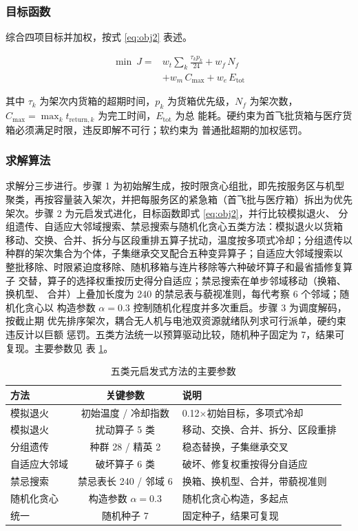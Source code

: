 \subsubsection{目标函数}

综合四项目标并加权，按式 \eqref{eq:obj2} 表述。

\begin{equation}
\begin{aligned}
\min\ J ={} & w_t \sum_k \frac{\tau_k p_k}{24} + w_f\, N_f \\
& + w_m\, C_{\max} + w_e\, E_{\mathrm{tot}}
\end{aligned}
\label{eq:obj2}
\end{equation}

其中 $\tau_k$ 为架次内货箱的超期时间，$p_k$ 为货箱优先级，$N_f$ 为架次数，
$C_{\max}=\max_k t_{\mathrm{return},k}$ 为完工时间，$E_{\mathrm{tot}}$ 为总
能耗。硬约束为首飞批货箱与医疗货箱必须满足时限，违反即解不可行；软约束为
普通批超期的加权惩罚。

\subsubsection{求解算法}

求解分三步进行。步骤 1 为初始解生成，按时限贪心组批，即先按服务区与机型
聚类，再按容量装入架次，并把每服务区的紧急箱（首飞批与医疗箱）拆出为优先
架次。步骤 2 为元启发式进化，目标函数即式 \eqref{eq:obj2}，并行比较模拟退火、
分组遗传、自适应大邻域搜索、禁忌搜索与随机化贪心五类方法：模拟退火以货箱
移动、交换、合并、拆分与区段重排五算子扰动，温度按多项式冷却；分组遗传以
种群的架次集合为个体，子集继承交叉配合五种变异算子；自适应大邻域搜索以
整批移除、时限紧迫度移除、随机移箱与连片移除等六种破坏算子和最省插修复算子
交替，算子的选择权重按历史得分自适应；禁忌搜索在单步邻域移动（换箱、换机型、
合并）上叠加长度为 240 的禁忌表与藐视准则，每代考察 6 个邻域；随机化贪心以
构造参数 $\alpha=0.3$ 控制随机化程度并多次重启。步骤 3 为调度解码，按截止期
优先排序架次，耦合无人机与电池双资源就绪队列求可行派单，硬约束违反计以巨额
惩罚。五类方法统一以预算驱动比较，随机种子固定为 7，结果可复现。主要参数见
表 \ref{tab:gaparams}。

\begin{table}[htbp]
\centering
\caption{五类元启发式方法的主要参数}
\label{tab:gaparams}
\begin{tabular}{lcl}
\toprule
方法 & 关键参数 & 说明 \\
\midrule
模拟退火 & 初始温度 / 冷却指数 & 0.12$\times$初始目标，多项式冷却 \\
模拟退火 & 扰动算子 5 类 & 移动、交换、合并、拆分、区段重排 \\
分组遗传 & 种群 28 / 精英 2 & 稳态替换，子集继承交叉 \\
自适应大邻域 & 破坏算子 6 类 & 破坏、修复权重按得分自适应 \\
禁忌搜索 & 禁忌表长 240 / 邻域 6 & 换箱、换机型、合并，带藐视准则 \\
随机化贪心 & 构造参数 $\alpha=0.3$ & 随机化贪心构造，多起点 \\
统一 & 随机种子 7 & 固定种子，结果可复现 \\
\bottomrule
\end{tabular}
\end{table}

